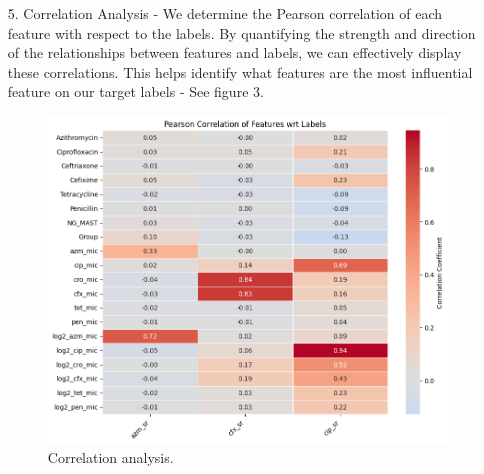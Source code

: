 \documentclass[manuscript,screen,review, nonacm]{acmart}
\begin{document}
\begin{itemize}
    \item[5.] Correlation Analysis - We determine the Pearson correlation of each feature with respect to the labels. By quantifying the strength and direction of the relationships between features and labels, we can effectively display these correlations. This helps identify what features are the most influential
    feature on our target labels - See figure 3.
            \begin{figure}[H]
                \centering
                \vspace{-15pt}
                \includegraphics[width=1\textwidth]{figures/corr.png}
                \caption{Correlation analysis.}
                \vspace{-15pt}
            \end{figure}


\end{itemize}
\end{document}
